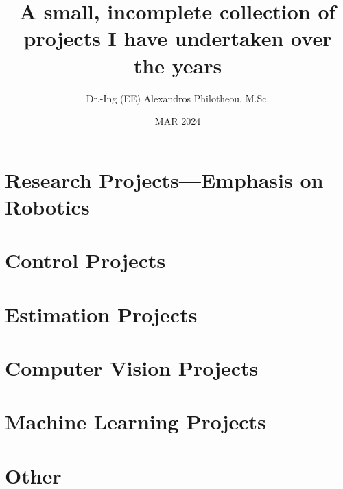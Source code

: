 






  \title{\Huge A small, incomplete collection of projects I have undertaken over the years}
  \author{Dr.-Ing (EE) Alexandros Philotheou, M.Sc. }
  \date{MAR 2024}
  \maketitle
  \vspace{2cm}

  \tableofcontents
  \thispagestyle{empty}
  \clearpage

  \section{Research Projects---Emphasis on Robotics}
    

  \section{Control Projects}
    
    
    
    
    \newpage

  \section{Estimation Projects}
    
    \newpage

  \section{Computer Vision Projects}
    
    \newpage

  \section{Machine Learning Projects}
    

  \section{Other}
    

  \cleardoublepage
\printbibliography[heading=none,notcategory=nobibliography]


